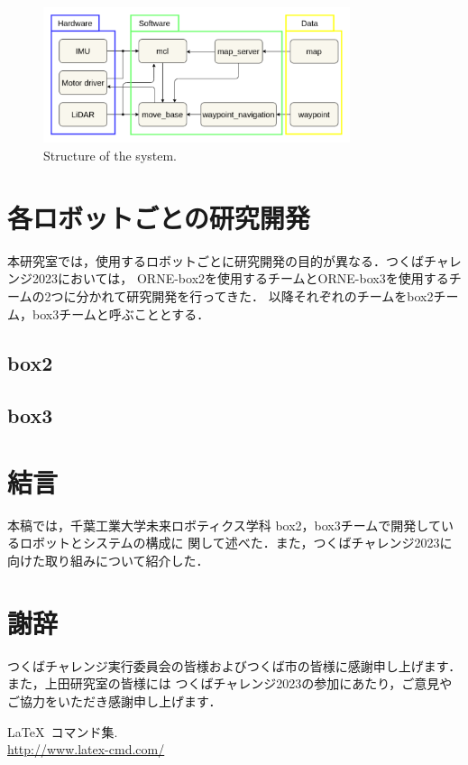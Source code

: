 \documentclass[twocolumn, 9pt]{jsproceedings}
\begin{document}
\begin{figure}[h!]
  \centering
  \includegraphics[width=90mm]{fig/software.pdf}
  \caption{Structure of the system.}
  \label{fig:soft-fig}%
\end{figure}


\section{各ロボットごとの研究開発}
本研究室では，使用するロボットごとに研究開発の目的が異なる．つくばチャレンジ2023においては，
ORNE-box2を使用するチームとORNE-box3を使用するチームの2つに分かれて研究開発を行ってきた．
以降それぞれのチームをbox2チーム，box3チームと呼ぶこととする．
\subsection{box2}
\subsection{box3}

\section{結言}
本稿では，千葉工業大学未来ロボティクス学科 box2，box3チームで開発しているロボットとシステムの構成に
関して述べた．また，つくばチャレンジ2023に向けた取り組みについて紹介した．

\section*{謝辞}
つくばチャレンジ実行委員会の皆様およびつくば市の皆様に感謝申し上げます．また，上田研究室の皆様には
つくばチャレンジ2023の参加にあたり，ご意見やご協力をいただき感謝申し上げます．


\footnotesize
\begin{thebibliography}{99}
\LaTeX~コマンド集.\\
\url{http://www.latex-cmd.com/}


\end{thebibliography}
\normalsize
\end{document}
